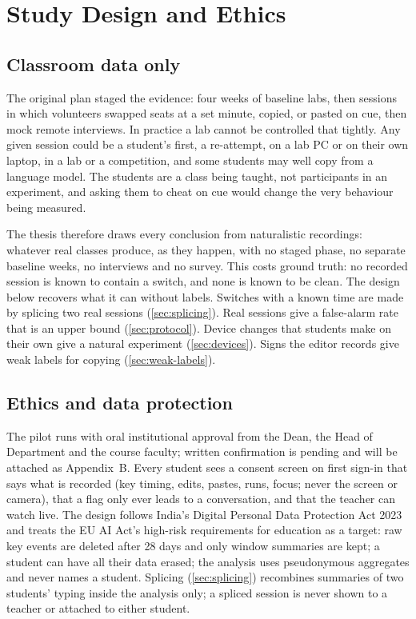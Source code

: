 \chapter{Study Design and Ethics}
\label{ch:study}

\section{Classroom data only}
\label{sec:naturalistic}
The original plan staged the evidence: four weeks of baseline labs, then sessions in
which volunteers swapped seats at a set minute, copied, or pasted on cue, then mock
remote interviews. In practice a lab cannot be controlled that tightly. Any given
session could be a student's first, a re-attempt, on a lab PC or on their own laptop,
in a lab or a competition, and some students may well copy from a language model. The
students are a class being taught, not participants in an experiment, and asking them
to cheat on cue would change the very behaviour being measured.

The thesis therefore draws every conclusion from naturalistic recordings: whatever real
classes produce, as they happen, with no staged phase, no separate baseline weeks, no
interviews and no survey. This costs ground truth: no recorded session is known to
contain a switch, and none is known to be clean. The design below recovers what it can
without labels. Switches with a known time are made by splicing two real sessions
(\cref{sec:splicing}). Real sessions give a false-alarm rate that is an upper bound
(\cref{sec:protocol}). Device changes that students make on their own give a natural
experiment (\cref{sec:devices}). Signs the editor records give weak labels for copying
(\cref{sec:weak-labels}).

\section{Ethics and data protection}
\label{sec:ethics}
The pilot runs with oral institutional approval from the Dean, the Head of Department and
the course faculty; written confirmation is pending and will be attached as
Appendix~B. Every student sees a consent screen on first sign-in that says what is
recorded (key timing, edits, pastes, runs, focus; never the screen or camera), that a
flag only ever leads to a conversation, and that the teacher can watch live. The design
follows India's Digital Personal Data Protection Act 2023 and treats the EU AI Act's
high-risk requirements for education as a target: raw key events are deleted after 28
days and only window summaries are kept; a student can have all their data erased; the
analysis uses pseudonymous aggregates and never names a student. Splicing
(\cref{sec:splicing}) recombines summaries of two students' typing inside the analysis
only; a spliced session is never shown to a teacher or attached to either student.

